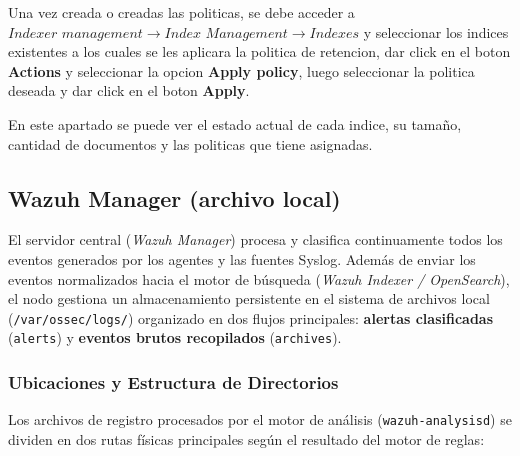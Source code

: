 Una vez creada o creadas las politicas, se debe acceder a $\textit{Indexer management} \rightarrow \textit{Index Management} \rightarrow \textit{Indexes}$ y seleccionar los indices existentes a los cuales se les aplicara la politica de retencion, dar click en el boton \textbf{Actions} y seleccionar la opcion \textbf{Apply policy}, luego seleccionar la politica deseada y dar click en el boton \textbf{Apply}.

En este apartado se puede ver el estado actual de cada indice, su tamaño, cantidad de documentos y las politicas que tiene asignadas.

\subsection{Wazuh Manager (archivo local)}
El servidor central (\textit{Wazuh Manager}) procesa y clasifica continuamente todos los eventos generados por los agentes y las fuentes Syslog. Además de enviar los eventos normalizados hacia el motor de búsqueda (\textit{Wazuh Indexer / OpenSearch}), el nodo gestiona un almacenamiento persistente en el sistema de archivos local (\texttt{/var/ossec/logs/}) organizado en dos flujos principales: \textbf{alertas clasificadas} (\texttt{alerts}) y \textbf{eventos brutos recopilados} (\texttt{archives}).

\subsubsection{Ubicaciones y Estructura de Directorios}

Los archivos de registro procesados por el motor de análisis (\texttt{wazuh-analysisd}) se dividen en dos rutas físicas principales según el resultado del motor de reglas:

